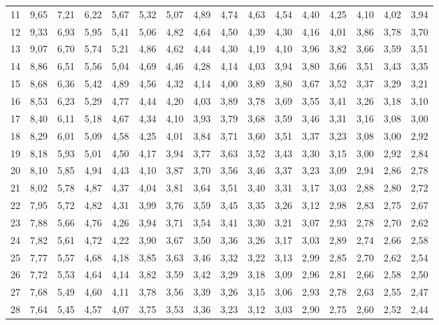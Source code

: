 \documentclass[a4paper,10pt]{extarticle}
\begin{document}
\begin{center}
\begin{tabular}{r|rrrrrrrrrrrrrrr}
11 & 9,65 & 7,21 & 6,22 & 5,67 & 5,32 & 5,07 & 4,89 & 4,74 & 4,63 & 4,54 & 4,40 & 4,25 & 4,10 & 4,02 & 3,94\\
12 & 9,33 & 6,93 & 5,95 & 5,41 & 5,06 & 4,82 & 4,64 & 4,50 & 4,39 & 4,30 & 4,16 & 4,01 & 3,86 & 3,78 & 3,70\\
13 & 9,07 & 6,70 & 5,74 & 5,21 & 4,86 & 4,62 & 4,44 & 4,30 & 4,19 & 4,10 & 3,96 & 3,82 & 3,66 & 3,59 & 3,51\\
14 & 8,86 & 6,51 & 5,56 & 5,04 & 4,69 & 4,46 & 4,28 & 4,14 & 4,03 & 3,94 & 3,80 & 3,66 & 3,51 & 3,43 & 3,35\\
15 & 8,68 & 6,36 & 5,42 & 4,89 & 4,56 & 4,32 & 4,14 & 4,00 & 3,89 & 3,80 & 3,67 & 3,52 & 3,37 & 3,29 & 3,21\\
16 & 8,53 & 6,23 & 5,29 & 4,77 & 4,44 & 4,20 & 4,03 & 3,89 & 3,78 & 3,69 & 3,55 & 3,41 & 3,26 & 3,18 & 3,10\\
17 & 8,40 & 6,11 & 5,18 & 4,67 & 4,34 & 4,10 & 3,93 & 3,79 & 3,68 & 3,59 & 3,46 & 3,31 & 3,16 & 3,08 & 3,00\\
18 & 8,29 & 6,01 & 5,09 & 4,58 & 4,25 & 4,01 & 3,84 & 3,71 & 3,60 & 3,51 & 3,37 & 3,23 & 3,08 & 3,00 & 2,92\\
19 & 8,18 & 5,93 & 5,01 & 4,50 & 4,17 & 3,94 & 3,77 & 3,63 & 3,52 & 3,43 & 3,30 & 3,15 & 3,00 & 2,92 & 2,84\\
20 & 8,10 & 5,85 & 4,94 & 4,43 & 4,10 & 3,87 & 3,70 & 3,56 & 3,46 & 3,37 & 3,23 & 3,09 & 2,94 & 2,86 & 2,78\\
21 & 8,02 & 5,78 & 4,87 & 4,37 & 4,04 & 3,81 & 3,64 & 3,51 & 3,40 & 3,31 & 3,17 & 3,03 & 2,88 & 2,80 & 2,72\\
22 & 7,95 & 5,72 & 4,82 & 4,31 & 3,99 & 3,76 & 3,59 & 3,45 & 3,35 & 3,26 & 3,12 & 2,98 & 2,83 & 2,75 & 2,67\\
23 & 7,88 & 5,66 & 4,76 & 4,26 & 3,94 & 3,71 & 3,54 & 3,41 & 3,30 & 3,21 & 3,07 & 2,93 & 2,78 & 2,70 & 2,62\\
24 & 7,82 & 5,61 & 4,72 & 4,22 & 3,90 & 3,67 & 3,50 & 3,36 & 3,26 & 3,17 & 3,03 & 2,89 & 2,74 & 2,66 & 2,58\\
25 & 7,77 & 5,57 & 4,68 & 4,18 & 3,85 & 3,63 & 3,46 & 3,32 & 3,22 & 3,13 & 2,99 & 2,85 & 2,70 & 2,62 & 2,54\\
26 & 7,72 & 5,53 & 4,64 & 4,14 & 3,82 & 3,59 & 3,42 & 3,29 & 3,18 & 3,09 & 2,96 & 2,81 & 2,66 & 2,58 & 2,50\\
27 & 7,68 & 5,49 & 4,60 & 4,11 & 3,78 & 3,56 & 3,39 & 3,26 & 3,15 & 3,06 & 2,93 & 2,78 & 2,63 & 2,55 & 2,47\\
28 & 7,64 & 5,45 & 4,57 & 4,07 & 3,75 & 3,53 & 3,36 & 3,23 & 3,12 & 3,03 & 2,90 & 2,75 & 2,60 & 2,52 & 2,44\\

\end{tabular}
\end{center}
\end{document}
